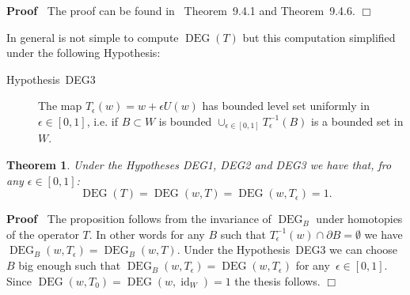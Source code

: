 \documentclass[a4paper,10pt]{article}
\newcommand{\tmop}[1]{\ensuremath{\operatorname{#1}}}
\newenvironment{proof}{\noindent\textbf{Proof\ }}{\hspace*{\fill}$\Box$\medskip}
\newtheorem{theorem}{Theorem}
\begin{document}
\begin{proof}
  The proof can be found in~{\cite{Ustunel2000}} Theorem~9.4.1 and
  Theorem~9.4.6.
\end{proof}

In general is not simple to compute $\tmop{DEG} (T)$ but this computation
simplified under the following Hypothesis:
\begin{description}
  \item[Hypothesis~DEG3] The map $T_{\epsilon} (w) = w + \epsilon U (w)$ has
  bounded level set uniformly in $\epsilon \in [0, 1]$, i.e. if $B \subset W$
  is bounded $\cup_{\epsilon \in [0, 1]} T^{- 1}_{\epsilon} (B)$ is a bounded
  set in $W$.
\end{description}
\begin{theorem}
  \label{theorem_wienerspace4}Under the Hypotheses DEG1, DEG2 and DEG3 we have
  that, fro any $\epsilon \in [0, 1]$:
  \[ \tmop{DEG} (T) = \tmop{DEG} (w, T) = \tmop{DEG} (w, T_{\epsilon}) = 1. \]
\end{theorem}

\begin{proof}
  The proposition follows from the invariance of $\tmop{DEG}_B$ under
  homotopies of the operator $T$. In other words for any $B$ such that $T^{-
  1}_{\epsilon} (w) \cap \partial B = \emptyset$ we have $\tmop{DEG}_B (w,
  T_{\epsilon}) = \tmop{DEG}_B (w, T)$. Under the Hypothesis~DEG3 we can
  choose $B$ big enough such that $\tmop{DEG}_B (w, T_{\epsilon}) = \tmop{DEG}
  (w, T_{\epsilon})$ for any~$\epsilon \in [0, 1]$. Since $\tmop{DEG} (w, T_0)
  = \tmop{DEG} (w, \tmop{id}_W) = 1$ the thesis follows.
\end{proof}
\end{document}
